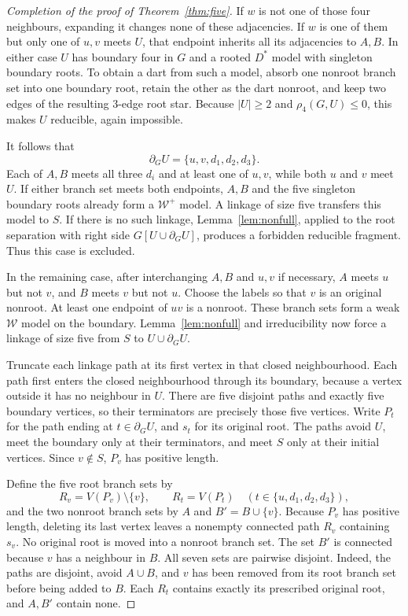 \documentclass[11pt]{article}
\theoremstyle{remark}
\numberwithin{equation}{section}
\newcommand{\W}{\mathcal W}
\newcommand{\dd}{\partial}
\begin{document}
\begin{proof}[Completion of the proof of Theorem~\ref{thm:five}]
If $w$ is not one of those four neighbours, expanding it changes none of these adjacencies. If $w$ is one of them but only one of $u,v$ meets $U$, that endpoint inherits all its adjacencies to $A,B$. In either case $U$ has boundary four in $G$ and a rooted $D^*$ model with singleton boundary roots. To obtain a dart from such a model, absorb one nonroot branch set into one boundary root, retain the other as the dart nonroot, and keep two edges of the resulting 3-edge root star. Because $|U|\ge2$ and $\rho_4(G,U)\le0$, this makes $U$ reducible, again impossible.

It follows that
\[
\dd_GU=\{u,v,d_1,d_2,d_3\}.
\]
Each of $A,B$ meets all three $d_i$ and at least one of $u,v$, while both $u$ and $v$ meet $U$. If either branch set meets both endpoints, $A,B$ and the five singleton boundary roots already form a $\W^+$ model. A linkage of size five transfers this model to $S$. If there is no such linkage, Lemma~\ref{lem:nonfull}, applied to the root separation with right side $G[U\cup\dd_GU]$, produces a forbidden reducible fragment. Thus this case is excluded.

In the remaining case, after interchanging $A,B$ and $u,v$ if necessary, $A$ meets $u$ but not $v$, and $B$ meets $v$ but not $u$. Choose the labels so that $v$ is an original nonroot. At least one endpoint of $uv$ is a nonroot. These branch sets form a weak $\W$ model on the boundary. Lemma~\ref{lem:nonfull} and irreducibility now force a linkage of size five from $S$ to $U\cup\dd_GU$.

Truncate each linkage path at its first vertex in that closed neighbourhood. Each path first enters the closed neighbourhood through its boundary, because a vertex outside it has no neighbour in $U$. There are five disjoint paths and exactly five boundary vertices, so their terminators are precisely those five vertices. Write $P_t$ for the path ending at $t\in\dd_GU$, and $s_t$ for its original root. The paths avoid $U$, meet the boundary only at their terminators, and meet $S$ only at their initial vertices. Since $v\notin S$, $P_v$ has positive length.

Define the five root branch sets by
\[
R_v=V(P_v)\setminus\{v\},\qquad
R_t=V(P_t)\quad(t\in\{u,d_1,d_2,d_3\}),
\]
and the two nonroot branch sets by $A$ and $B'=B\cup\{v\}$. Because $P_v$ has positive length, deleting its last vertex leaves a nonempty connected path $R_v$ containing $s_v$. No original root is moved into a nonroot branch set. The set $B'$ is connected because $v$ has a neighbour in $B$. All seven sets are pairwise disjoint. Indeed, the paths are disjoint, avoid $A\cup B$, and $v$ has been removed from its root branch set before being added to $B$. Each $R_t$ contains exactly its prescribed original root, and $A,B'$ contain none.



\end{proof}
\end{document}
